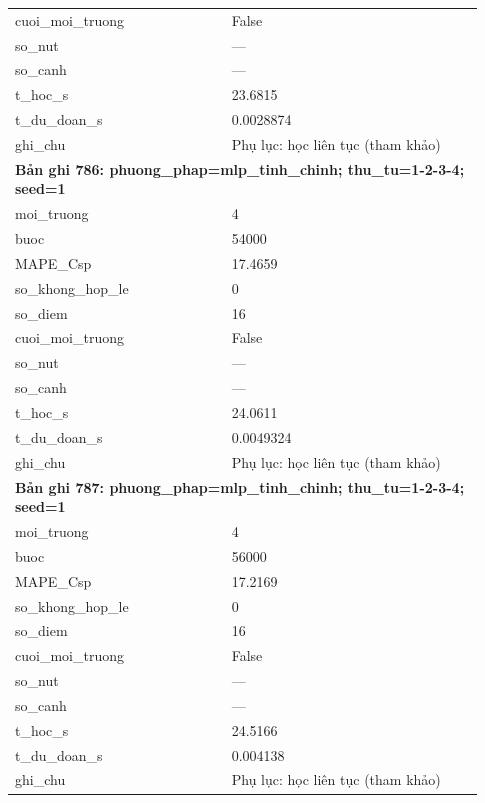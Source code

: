 \begin{longtable}{p{0.43\linewidth}p{0.50\linewidth}}
cuoi\_\allowbreak moi\_\allowbreak truong & False \\
so\_\allowbreak nut & — \\
so\_\allowbreak canh & — \\
t\_\allowbreak hoc\_\allowbreak s & 23.6815 \\
t\_\allowbreak du\_\allowbreak doan\_\allowbreak s & 0.0028874 \\
ghi\_\allowbreak chu & Phụ lục: học liên tục (tham khảo) \\
\midrule
\multicolumn{2}{p{0.95\linewidth}}{\textbf{Bản ghi 786: phuong\_phap=mlp\_tinh\_chinh; thu\_tu=1-2-3-4; seed=1}} \\
moi\_\allowbreak truong & 4 \\
buoc & 54000 \\
MAPE\_\allowbreak Csp & 17.4659 \\
so\_\allowbreak khong\_\allowbreak hop\_\allowbreak le & 0 \\
so\_\allowbreak diem & 16 \\
cuoi\_\allowbreak moi\_\allowbreak truong & False \\
so\_\allowbreak nut & — \\
so\_\allowbreak canh & — \\
t\_\allowbreak hoc\_\allowbreak s & 24.0611 \\
t\_\allowbreak du\_\allowbreak doan\_\allowbreak s & 0.0049324 \\
ghi\_\allowbreak chu & Phụ lục: học liên tục (tham khảo) \\
\midrule
\multicolumn{2}{p{0.95\linewidth}}{\textbf{Bản ghi 787: phuong\_phap=mlp\_tinh\_chinh; thu\_tu=1-2-3-4; seed=1}} \\
moi\_\allowbreak truong & 4 \\
buoc & 56000 \\
MAPE\_\allowbreak Csp & 17.2169 \\
so\_\allowbreak khong\_\allowbreak hop\_\allowbreak le & 0 \\
so\_\allowbreak diem & 16 \\
cuoi\_\allowbreak moi\_\allowbreak truong & False \\
so\_\allowbreak nut & — \\
so\_\allowbreak canh & — \\
t\_\allowbreak hoc\_\allowbreak s & 24.5166 \\
t\_\allowbreak du\_\allowbreak doan\_\allowbreak s & 0.004138 \\
ghi\_\allowbreak chu & Phụ lục: học liên tục (tham khảo) \\

\end{longtable}
